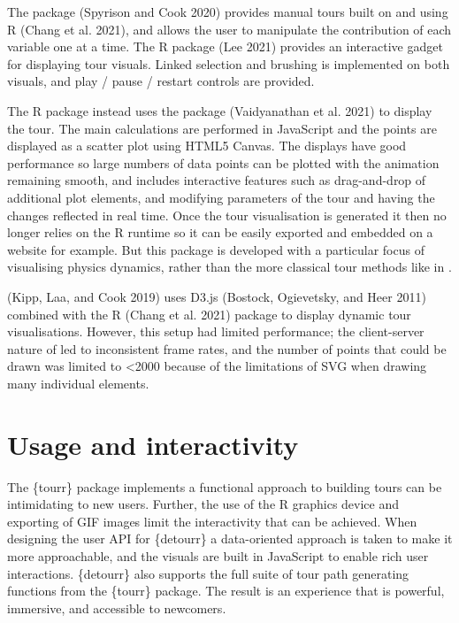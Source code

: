 The  package (Spyrison and Cook 2020) provides manual tours built on  and using R  (Chang et al. 2021), and allows the user to manipulate the contribution of each variable one at a time. The  R package (Lee 2021) provides an interactive gadget for displaying tour visuals. Linked selection and brushing is implemented on both visuals, and play / pause / restart controls are provided.

The  R package instead uses the  package (Vaidyanathan et al. 2021) to display the tour. The main calculations are performed in JavaScript and the points are displayed as a scatter plot using HTML5 Canvas. The displays have good performance so large numbers of data points can be plotted with the animation remaining smooth, and includes interactive features such as drag-and-drop of additional plot elements, and modifying parameters of the tour and having the changes reflected in real time. Once the tour visualisation is generated it then no longer relies on the R runtime so it can be easily exported and embedded on a website for example. But this package is developed with a particular focus of visualising physics dynamics, rather than the more classical tour methods like in .

(Kipp, Laa, and Cook 2019) uses D3.js (Bostock, Ogievetsky, and Heer 2011) combined with the R  (Chang et al. 2021) package to display dynamic tour visualisations. However, this setup had limited performance; the client-server nature of  led to inconsistent frame rates, and the number of points that could be drawn was limited to \textless2000 because of the limitations of SVG when drawing many individual elements.

\pagebreak

\hypertarget{ch:implementation}{%
\section{Usage and interactivity}\label{ch:implementation}}

The \{tourr\} package implements a functional approach to building tours can be intimidating to new users. Further, the use of the R graphics device and exporting of GIF images limit the interactivity that can be achieved. When designing the user API for \{detourr\} a data-oriented approach is taken to make it more approachable, and the visuals are built in JavaScript to enable rich user interactions. \{detourr\} also supports the full suite of tour path generating functions from the \{tourr\} package. The result is an experience that is powerful, immersive, and accessible to newcomers.


